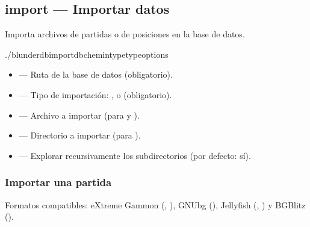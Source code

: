 \documentclass[letterpaper,10pt,spanish]{sphinxmanual}
\begin{document}
\subsection{import — Importar datos}
\label{\detokenize{cli:import-importer-des-donnees}}
\sphinxAtStartPar
Importa archivos de partidas o de posiciones en la base de datos.

\begin{sphinxVerbatim}[commandchars=\\\{\}]
./blunderdbimport\PYGZhy{}\PYGZhy{}db\PYGZlt{}chemin\PYGZgt{}\PYGZhy{}\PYGZhy{}type\PYGZlt{}type\PYGZgt{}\PYG{o}{[}options\PYG{o}{]}
\end{sphinxVerbatim}

\sphinxAtStartPar
{}
\begin{itemize}
\item {} 
\sphinxAtStartPar
{} — Ruta de la base de datos (obligatorio).

\item {} 
\sphinxAtStartPar
{} — Tipo de importación: ,  o  (obligatorio).

\item {} 
\sphinxAtStartPar
{} — Archivo a importar (para  y ).

\item {} 
\sphinxAtStartPar
{} — Directorio a importar (para ).

\item {} 
\sphinxAtStartPar
{} — Explorar recursivamente los subdirectorios (por defecto: sí).

\end{itemize}


\subsubsection{Importar una partida}
\label{\detokenize{cli:import-d-un-match}}
\sphinxAtStartPar
Formatos compatibles: eXtreme Gammon (, ), GNUbg (), Jellyfish (, ) y BGBlitz ().
\end{document}
